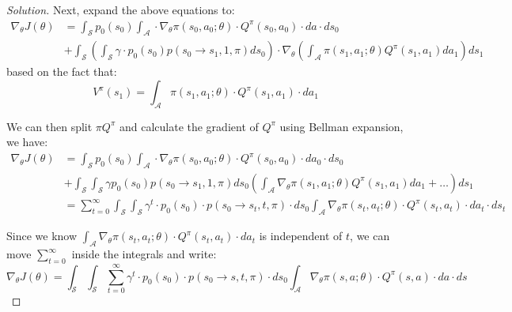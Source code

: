 \documentclass[12pt]{article}
\newenvironment{solution}
  {\renewcommand\qedsymbol{$\blacksquare$}\begin{proof}[Solution]}
  {\end{proof}}
\begin{document}
\begin{solution}
Next, expand the above equations to:
\begin{equation}
\begin{aligned}
\nabla_{\theta} J(\theta)
&=\int_{\mathcal{S}} p_{0}\left(s_{0}\right) \int_{\mathcal{A}} \cdot \nabla_{\theta} \pi\left(s_{0}, a_{0} ; \theta\right) \cdot Q^{\pi}\left(s_{0}, a_{0}\right) \cdot d a \cdot d s_{0} \\
&+\int_{\mathcal{S}}\left(\int_{\mathcal{S}} \gamma \cdot p_{0}\left(s_{0}\right) p\left(s_{0} \rightarrow s_{1}, 1, \pi\right) d s_{0}\right) \cdot \nabla_{\theta}\left(\int_{\mathcal{A}} \pi\left(s_{1}, a_{1} ; \theta\right) Q^{\pi}\left(s_{1}, a_{1}\right) d a_{1}\right) d s_{1}
\end{aligned}
\end{equation}
based on the fact that:
\begin{equation}
V^{\pi}\left(s_{1}\right) = \int_{\mathcal{A}} \pi\left(s_{1}, a_{1} ; \theta\right) \cdot Q^{\pi}\left(s_{1}, a_{1}\right) \cdot d a_{1}
\end{equation}

We can then split $\pi Q^\pi$ and calculate the gradient of $Q^\pi$ using Bellman expansion, we have:
\begin{equation}
	\begin{aligned}
	\nabla_{\theta} J(\theta)
	&=\int_{\mathcal{S}} p_{0}\left(s_{0}\right) \int_{\mathcal{A}} \cdot \nabla_{\theta} \pi\left(s_{0}, a_{0} ; \theta\right) \cdot Q^{\pi}\left(s_{0}, a_{0}\right) \cdot d a_{0} \cdot d s_{0} \\
	&+\int_{\mathcal{S}} \int_{\mathcal{S}} \gamma p_{0}\left(s_{0}\right) p\left(s_{0} \rightarrow s_{1}, 1, \pi\right) d s_{0}\left(\int_{\mathcal{A}} \nabla_{\theta} \pi\left(s_{1}, a_{1} ; \theta\right) Q^{\pi}\left(s_{1}, a_{1}\right) d a_{1}+\ldots\right) d s_{1} \\
	&=\sum_{t=0}^{\infty} \int_{\mathcal{S}} \int_{\mathcal{S}} \gamma^{t} \cdot p_{0}\left(s_{0}\right) \cdot p\left(s_{0} \rightarrow s_{t}, t, \pi\right) \cdot d s_{0} \int_{\mathcal{A}} \nabla_{\theta} \pi\left(s_{t}, a_{t} ; \theta\right) \cdot Q^{\pi}\left(s_{t}, a_{t}\right) \cdot d a_{t} \cdot d s_{t}
	\end{aligned}
\end{equation}

Since we know $\int_{\mathcal{A}} \nabla_{\theta} \pi\left(s_{t}, a_{t} ; \theta\right) \cdot Q^{\pi}\left(s_{t}, a_{t}\right) \cdot d a_{t}$ is independent of $t$, we can move $\sum_{t=0}^{\infty}$ inside the integrals and write:
\begin{equation}
	\nabla_{\theta} J(\theta) = \int_{\mathcal{S}} \int_{\mathcal{S}} \sum_{t=0}^{\infty} \gamma^{t} \cdot p_{0}\left(s_{0}\right) \cdot p\left(s_{0} \rightarrow s, t, \pi\right) \cdot ds_{0} \int_{\mathcal{A}} \nabla_{\theta} \pi(s, a ; \theta) \cdot Q^{\pi}(s, a) \cdot da \cdot ds
\end{equation}


\end{solution}
\end{document}
